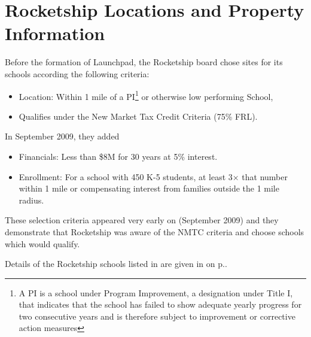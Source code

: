 \section{Rocketship Locations and Property Information}
\label{sec:location-and-property-info}\indent%

Before the formation of Launchpad, the Rocketship board chose sites for its schools according the following criteria:
\begin{itemize}
  \item Location: Within 1 mile of a PI\footnote{A PI is a school under Program Improvement, a designation under Title I, that indicates that the school has failed to show adequate yearly progress for two consecutive years and is therefore subject to improvement or corrective action measures} or otherwise low performing School, 
  \item Qualifies under the New Market Tax Credit Criteria (75\% FRL).
\end{itemize}
In September 2009, they added
\begin{itemize}
  \item Financials: Less than \$8M for 30 years at 5\% interest.
  \item Enrollment: For a school with 450 K-5 students, at least 3× that number within 1 mile or compensating interest from families outside the 1 mile radius.
\end{itemize}
These selection criteria appeared very early on (September 2009)\parencite{RSED2009b} and they demonstrate that Rocketship was aware of the NMTC criteria and choose schools which would qualify.

Details of the Rocketship schools listed in  are given in  on p.\pageref{appx:rocketship-property-info}.

